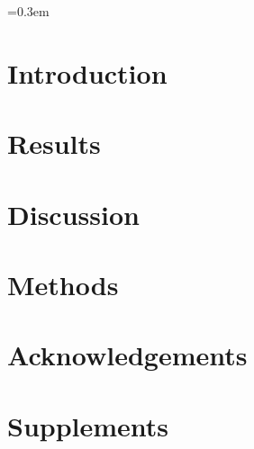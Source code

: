 \documentclass[a4paper, twocolumn]{article}
\newcommand{\beginsupplement}{%
        \setcounter{table}{0}
        \renewcommand{\thetable}{S\arabic{table}}%
        \setcounter{figure}{0}
        \renewcommand{\thefigure}{S\arabic{figure}}%
        }
\newcommand*{\ja}[1]{%
  \begin{CJK}{UTF8}{ipxm}#1\end{CJK}}
\begin{document}

\font=0.3em  %
\twocolumn

\section*{Introduction}


\section*{Results}


\section*{Discussion}


\section*{Methods}


\section*{Acknowledgements}


\ja{


}

\onecolumn
\beginsupplement
\section*{Supplements}

\end{document}
